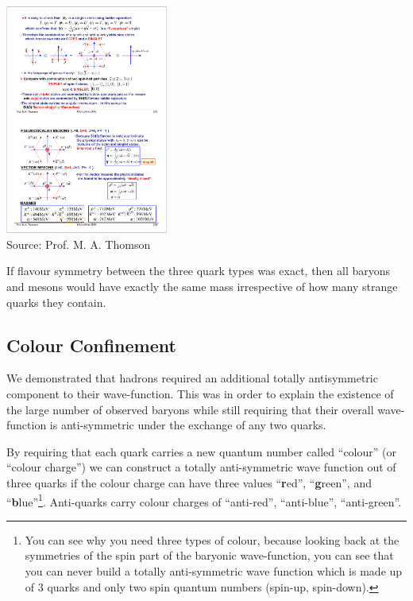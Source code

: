 \begin{center}
\includegraphics[width=0.4\textwidth]{fig/strongforce/scalar_mesons.pdf}\\
{\tiny Source: Prof. M. A. Thomson }
\end{center}
If flavour symmetry between the three quark types was exact, then all baryons and mesons would have exactly the same mass irrespective of how many strange quarks they contain.

\subsection{Colour Confinement}
We demonstrated that hadrons required an additional totally antisymmetric component to their wave-function. This was in order to explain the existence of the large number of observed baryons while still requiring that their overall wave-function is anti-symmetric under the exchange of any two quarks.

By requiring that each quark carries a new quantum number called ``colour'' (or ``colour charge'') we can construct a totally anti-symmetric wave function out of three quarks if the colour charge can have three values ``{\bf r}ed'', ``{\bf g}reen'', and ``{\bf b}lue''\footnote{You can see why you need three types of colour, because looking back at the symmetries of the spin part of the baryonic wave-function, you can see that you can never build a totally anti-symmetric wave function which is made up of 3 quarks and only two spin quantum numbers (spin-up, spin-down).}. Anti-quarks carry colour charges of ``anti-red'', ``anti-blue'', ``anti-green''.

